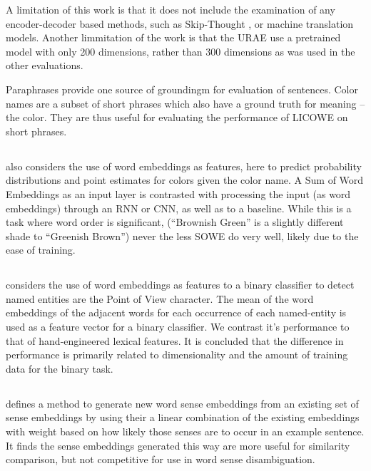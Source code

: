 \documentclass{book}
\begin{document}
A limitation of this work is that it does not include the examination of any encoder-decoder based methods, such as Skip-Thought \citep{DBLP:journals/corr/KirosZSZTUF15}, or machine translation models.
Another limmitation of the work is that the URAE use a pretrained model with only 200 dimensions, rather than 300 dimensions as was used in the other evaluations.


Paraphrases provide one source of groundingm for evaluation of sentences.
Color names are a subset of short phrases which also have a ground truth for meaning -- the color.
They are thus useful for evaluating the performance of LICOWE on short phrases.

\subsection{} also considers the use of word embeddings as features, here to predict probability distributions and point estimates for colors given the color name. A Sum of Word Embeddings as an input layer is contrasted with processing the input (as word embeddings) through an RNN or CNN, as well as to a baseline. While this is a task where word order is significant, (``Brownish Green'' is a slightly different shade to ``Greenish Brown'') never the less SOWE do very well, likely due to the ease of training.

\subsection{} considers the use of word embeddings as features to a binary classifier to detect named entities are the Point of View character. The mean of the word embeddings of the adjacent words for each occurrence of each named-entity is used as a feature vector for a binary classifier. We contrast it's performance to that of hand-engineered lexical features. It is concluded that the difference in performance is primarily related to dimensionality and the amount of training data for the binary task.

\subsection{} defines a method to generate new word sense embeddings from an existing set of sense embeddings by using their a linear combination of the existing embeddings with weight based on how likely those senses are to occur in an example sentence. It finds the sense embeddings generated this way are more useful for similarity comparison, but not competitive for use in word sense disambiguation.
\end{document}
